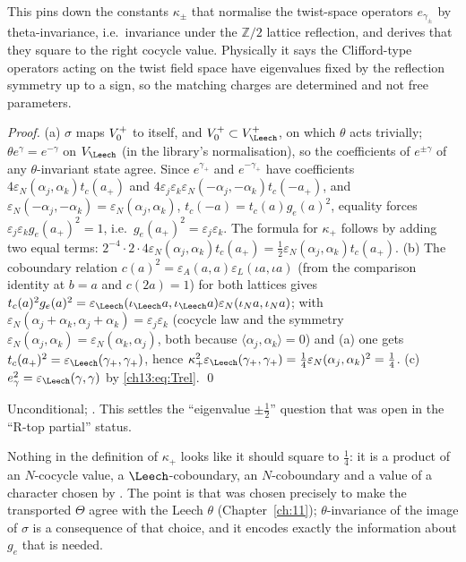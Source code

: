 \begin{physics}
This pins down the constants $\kappa_\pm$ that normalise the twist-space operators $e_{\gamma_\pm}$ by theta-invariance, i.e.\ invariance under the $\mathbb Z/2$ lattice reflection, and derives that they square to the right cocycle value. Physically it says the Clifford-type operators acting on the twist field space have eigenvalues fixed by the reflection symmetry up to a sign, so the matching charges are determined and not free parameters.
\end{physics}
\noindent\emph{Proof.} (a) $\sigma$ maps $V_0^{+}$ to itself, and $\chthirteenV\subset V_\Leech^+$, on which $\theta$ acts trivially;
$\theta e^\gamma=e^{-\gamma}$ on $V_\Leech$ (in the library's normalisation), so the coefficients of $e^{\pm\gamma}$ of any
$\theta$-invariant state agree. Since $e^{\gamma_+}$ and $e^{-\gamma_+}$ have coefficients
$4\varepsilon_N(\alpha_j,\alpha_k)t_c(a_+)$ and $4\varepsilon_j\varepsilon_k\varepsilon_N(-\alpha_j,-\alpha_k)t_c(-a_+)$, and
$\varepsilon_N(-\alpha_j,-\alpha_k)=\varepsilon_N(\alpha_j,\alpha_k)$, $t_c(-a)=t_c(a)g_e(a)^2$, equality forces
$\varepsilon_j\varepsilon_kg_e(a_+)^2=1$, i.e.\ $g_e(a_+)^2=\varepsilon_j\varepsilon_k$. The formula for $\kappa_+$ follows by adding two equal
terms: $2^{-4}\cdot 2\cdot 4\varepsilon_N(\alpha_j,\alpha_k)t_c(a_+)=\tfrac12\varepsilon_N(\alpha_j,\alpha_k)t_c(a_+)$.
(b) The coboundary relation $c(a)^2=\varepsilon_A(a,a)\varepsilon_L(\iota a,\iota a)$ (from the comparison identity at
$b=a$ and $c(2a)=1$) for both lattices gives $t_c(a)^2g_e(a)^2=\varepsilon_\Leech(\iota_\Leech a,\iota_\Leech
a)\varepsilon_N(\iota_Na,\iota_Na)$; with $\varepsilon_N(\alpha_j+\alpha_k,\alpha_j+\alpha_k)=\varepsilon_j\varepsilon_k$ (cocycle law and the
symmetry $\varepsilon_N(\alpha_j,\alpha_k)=\varepsilon_N(\alpha_k,\alpha_j)$, both because $\langle\alpha_j,\alpha_k\rangle=0$) and (a) one gets
$t_c(a_+)^2=\varepsilon_\Leech(\gamma_+,\gamma_+)$, hence $\kappa_+^2\varepsilon_\Leech(\gamma_+,\gamma_+)=\tfrac14\varepsilon_N(\alpha_j,\alpha_k)^2=\tfrac14$.
(c) $e_\gamma^2=\varepsilon_\Leech(\gamma,\gamma)$ by \eqref{ch13:eq:Trel}. \qed
\begin{status}Unconditional; . This settles the
``eigenvalue $\pm\tfrac12$'' question that was open in the ``R-top partial'' status.\end{status}

\begin{remark}
Nothing in the definition of $\kappa_+$ looks like it should square to $\tfrac14$: it is a product of an
$N$-cocycle value, a $\Leech$-coboundary, an $N$-coboundary and a value of a character chosen by
. The point is that  was chosen precisely to make the transported
$\Theta$ agree with the Leech $\theta$ (Chapter~\ref{ch:11}); $\theta$-invariance of the image of $\sigma$ is a
consequence of that choice, and it encodes exactly the information about $g_e$ that is needed.
\end{remark}

